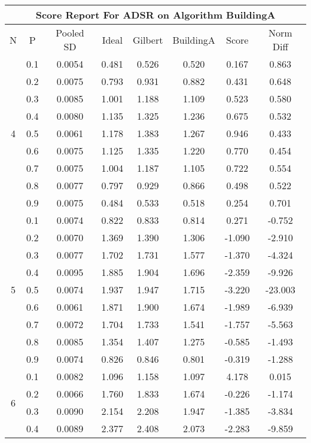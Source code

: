 \documentclass[11pt,a4paper]{report}
\begin{document}
\begin{longtable}{ | c | c || c | c | c | c | c | c | }
\hline
\multicolumn{8}{|c|}{ Score Report For ADSR on Algorithm BuildingA} \\
\hline
N & P & Pooled SD &  Ideal &  Gilbert & BuildingA  & Score & Norm Diff \\
 \hline
 \hline
 \endhead
\multirow{9}{*}{4} & 0.1 & 0.0054 & 0.481 & 0.526 & 0.520 & 0.167 & 0.863 \\
 & 0.2 & 0.0075 & 0.793 & 0.931 & 0.882 & 0.431 & 0.648 \\
 & 0.3 & 0.0085 & 1.001 & 1.188 & 1.109 & 0.523 & 0.580 \\
 & 0.4 & 0.0080 & 1.135 & 1.325 & 1.236 & 0.675 & 0.532 \\
 & 0.5 & 0.0061 & 1.178 & 1.383 & 1.267 & 0.946 & 0.433 \\
 & 0.6 & 0.0075 & 1.125 & 1.335 & 1.220 & 0.770 & 0.454 \\
 & 0.7 & 0.0075 & 1.004 & 1.187 & 1.105 & 0.722 & 0.554 \\
 & 0.8 & 0.0077 & 0.797 & 0.929 & 0.866 & 0.498 & 0.522 \\
 & 0.9 & 0.0075 & 0.484 & 0.533 & 0.518 & 0.254 & 0.701 \\
 \hline
\multirow{9}{*}{5} & 0.1 & 0.0074 & 0.822 & 0.833 & 0.814 & 0.271 & -0.752 \\
 & 0.2 & 0.0070 & 1.369 & 1.390 & 1.306 & -1.090 & -2.910 \\
 & 0.3 & 0.0077 & 1.702 & 1.731 & 1.577 & -1.370 & -4.324 \\
 & 0.4 & 0.0095 & 1.885 & 1.904 & 1.696 & -2.359 & -9.926 \\
 & 0.5 & 0.0074 & 1.937 & 1.947 & 1.715 & -3.220 & -23.003 \\
 & 0.6 & 0.0061 & 1.871 & 1.900 & 1.674 & -1.989 & -6.939 \\
 & 0.7 & 0.0072 & 1.704 & 1.733 & 1.541 & -1.757 & -5.563 \\
 & 0.8 & 0.0085 & 1.354 & 1.407 & 1.275 & -0.585 & -1.493 \\
 & 0.9 & 0.0074 & 0.826 & 0.846 & 0.801 & -0.319 & -1.288 \\
 \hline
\multirow{9}{*}{6} & 0.1 & 0.0082 & 1.096 & 1.158 & 1.097 & 4.178 & 0.015 \\
 & 0.2 & 0.0066 & 1.760 & 1.833 & 1.674 & -0.226 & -1.174 \\
 & 0.3 & 0.0090 & 2.154 & 2.208 & 1.947 & -1.385 & -3.834 \\
 & 0.4 & 0.0089 & 2.377 & 2.408 & 2.073 & -2.283 & -9.859 \\

\end{longtable}
\end{document}

